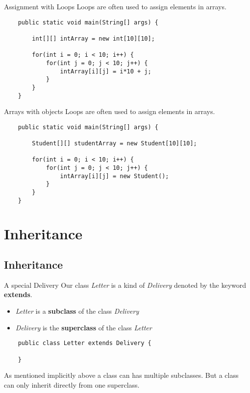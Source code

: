 \begin{frame}[fragile]{Assignment with Loops}
	Loops are often used to assign elements in arrays.
	\begin{lstlisting}
	public static void main(String[] args) {

	    int[][] intArray = new int[10][10];
	    
	    for(int i = 0; i < 10; i++) {
	        for(int j = 0; j < 10; j++) {
	            intArray[i][j] = i*10 + j;
	        }
	    }
	}
	\end{lstlisting}
\end{frame}

\begin{frame}[fragile]{Arrays with objects}
	Loops are often used to assign elements in arrays.
	\begin{lstlisting}
	public static void main(String[] args) {

	    Student[][] studentArray = new Student[10][10];
	    
	    for(int i = 0; i < 10; i++) {
	        for(int j = 0; j < 10; j++) {
	            intArray[i][j] = new Student();
	        }
	    }
	}
	\end{lstlisting}
\end{frame}

\section{Inheritance}
\subsection{Inheritance}


\begin{frame}[fragile]{A special Delivery}
	Our class \emph{Letter} is a kind of \emph{Delivery} denoted by the keyword \textbf{extends}.
	\begin{itemize}
		\item \emph{Letter} is a \textbf{subclass} of the class \emph{Delivery}
		\item \emph{Delivery} is the \textbf{superclass} of the class \emph{Letter}
	\end{itemize}
	\begin{lstlisting}
	public class Letter extends Delivery {
	
	}
	\end{lstlisting}
	\vfill
	As mentioned implicitly above a class can has multiple subclasses. 
	But a class can only inherit directly from one superclass.
\end{frame}

